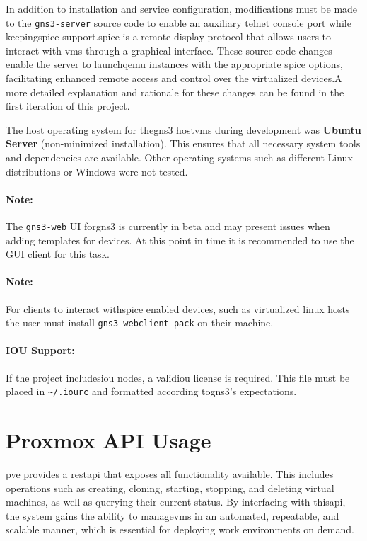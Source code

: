     In addition to installation and service configuration, modifications must be made to the \texttt{gns3-server} source 
    code to enable an auxiliary telnet console port while keeping\ac{spice} support.\ac{spice} is a remote display protocol that 
    allows users to interact with \ac{vm}s through a graphical interface. These source code changes enable the server to 
    launch\ac{qemu} instances with the appropriate \ac{spice} options, facilitating enhanced remote access and control over the 
    virtualized devices.A more detailed explanation and rationale for these changes can be found in the first iteration of 
    this project\cite{santos2024}.

    The host operating system for the\ac{gns3} host\ac{vm}s during development was \textbf{Ubuntu Server} (non-minimized 
    installation). This ensures that all necessary system tools and dependencies are available. Other operating systems 
    such as different Linux distributions or Windows were not tested.    

    \paragraph{Note:} The \texttt{gns3-web} UI for\ac{gns3} is currently in beta and may present issues when adding 
    templates for devices. At this point in time it is recommended to use the GUI client for this task.

    \paragraph{Note:} For clients to interact with\ac{spice} enabled devices, such as virtualized linux hosts the user must install 
    \texttt{gns3-webclient-pack} on their machine.

    \paragraph{IOU Support:} If the project includes\ac{iou} nodes, a valid\ac{iou} license is required. This file must be 
    placed in \texttt{\textasciitilde{}/.iourc} and formatted according to\ac{gns3}'s expectations.

\section{Proxmox API Usage}

    \ac{pve} provides a \ac{rest}\ac{api} that exposes all functionality available. This includes operations such as 
    creating, cloning, starting, stopping, and deleting virtual machines, as well as querying their current status. 
    By interfacing with this\ac{api}, the system gains the ability to manage\ac{vm}s in an automated, repeatable, and 
    scalable manner, which is essential for deploying work environments on demand.

